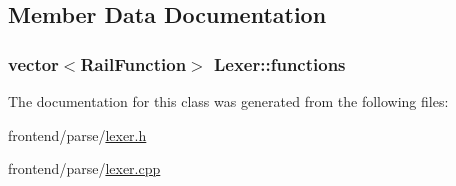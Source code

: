 \subsection{Member Data Documentation}
\hypertarget{classLexer_ad777c9574b2267f65ae9793a5a60c0a8}{
\subsubsection[{functions}]{\setlength{\rightskip}{0pt plus 5cm}vector$<${\bf Rail\-Function}$>$ Lexer\-::functions}}\label{classLexer_ad777c9574b2267f65ae9793a5a60c0a8}


The documentation for this class was generated from the following files\-:\begin{DoxyCompactItemize}
\item 
frontend/parse/\hyperlink{lexer_8h}{lexer.\-h}\item 
frontend/parse/\hyperlink{lexer_8cpp}{lexer.\-cpp}\end{DoxyCompactItemize}
